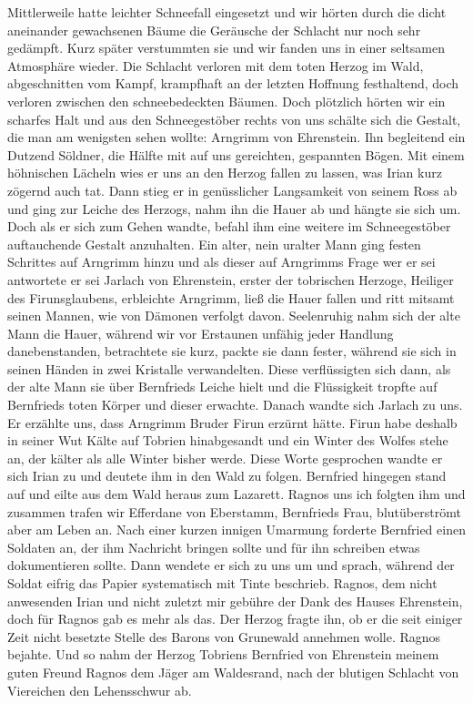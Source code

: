 Mittlerweile hatte leichter Schneefall eingesetzt und wir hörten durch die dicht aneinander gewachsenen Bäume die Geräusche der Schlacht nur noch sehr gedämpft. Kurz später verstummten sie und wir fanden uns in einer seltsamen Atmosphäre wieder. Die Schlacht verloren mit dem toten Herzog im Wald, abgeschnitten vom Kampf, krampfhaft an der letzten Hoffnung festhaltend, doch verloren zwischen den schneebedeckten Bäumen. Doch plötzlich hörten wir ein scharfes Halt und aus den Schneegestöber rechts von uns schälte sich die Gestalt, die man am wenigsten sehen wollte: Arngrimm von Ehrenstein. Ihn begleitend ein Dutzend Söldner, die Hälfte mit auf uns gereichten, gespannten Bögen. Mit einem höhnischen Lächeln wies er uns an den Herzog fallen zu lassen, was Irian kurz zögernd auch tat. Dann stieg er in genüsslicher Langsamkeit von seinem Ross ab und ging zur Leiche des Herzogs, nahm ihn die Hauer ab und hängte sie sich um. Doch als er sich zum Gehen wandte, befahl ihm eine weitere im Schneegestöber auftauchende Gestalt anzuhalten. Ein alter, nein uralter Mann ging festen Schrittes auf Arngrimm hinzu und als dieser auf Arngrimms Frage wer er sei antwortete er sei Jarlach von Ehrenstein, erster der tobrischen Herzoge, Heiliger des Firunsglaubens, erbleichte Arngrimm, ließ die Hauer fallen und ritt mitsamt seinen Mannen, wie von Dämonen verfolgt davon. Seelenruhig nahm sich der alte Mann die Hauer, während wir vor Erstaunen unfähig jeder Handlung danebenstanden, betrachtete sie kurz, packte sie dann fester, während sie sich in seinen Händen in zwei Kristalle verwandelten. Diese verflüssigten sich dann, als der alte Mann sie über Bernfrieds Leiche hielt und die Flüssigkeit tropfte auf Bernfrieds toten Körper und dieser erwachte. Danach wandte sich Jarlach zu uns. Er erzählte uns, dass Arngrimm Bruder Firun erzürnt hätte. Firun habe deshalb in seiner Wut Kälte auf Tobrien hinabgesandt und ein Winter des Wolfes stehe an, der kälter als alle Winter bisher werde. Diese Worte gesprochen wandte er sich Irian zu und deutete ihm in den Wald zu folgen. Bernfried hingegen stand auf und eilte aus dem Wald heraus zum Lazarett. Ragnos uns ich folgten ihm und zusammen trafen wir Efferdane von Eberstamm, Bernfrieds Frau, blutüberströmt aber am Leben an. Nach einer kurzen innigen Umarmung forderte Bernfried einen Soldaten an, der ihm Nachricht bringen sollte und für ihn schreiben etwas dokumentieren sollte. Dann wendete er sich zu uns um und sprach, während der Soldat eifrig das Papier systematisch mit Tinte beschrieb. Ragnos, dem nicht anwesenden Irian und nicht zuletzt mir gebühre der Dank des Hauses Ehrenstein, doch für Ragnos gab es mehr als das. Der Herzog fragte ihn, ob er die seit einiger Zeit nicht besetzte Stelle des Barons von Grunewald annehmen wolle. Ragnos bejahte. Und so nahm der Herzog Tobriens Bernfried von Ehrenstein meinem guten Freund Ragnos dem Jäger am Waldesrand, nach der blutigen Schlacht von Viereichen den Lehensschwur ab.

